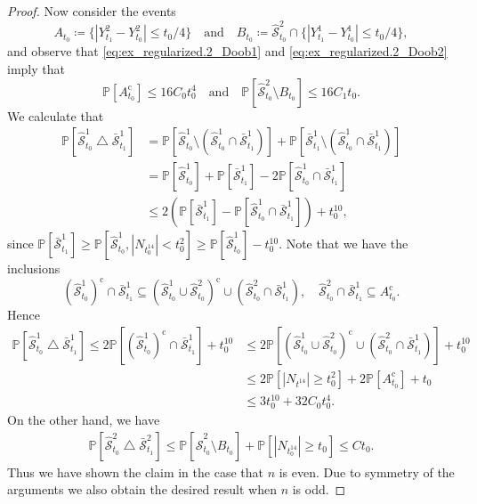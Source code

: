 \documentclass[12pt,oneside]{amsart}
\theoremstyle{definition}
\newcommand{\Scc}{\hat{\mathcal S}}
\newcommand{\Sccc}{\bar{\mathcal S}}
\def\P{{\mathbb P}}
\numberwithin{equation}{section}
\begin{document}
\begin{proof}
   Now consider the events
    \begin{equation}
        A_{t_0} \coloneqq \{ |Y_{t_1}^2 - Y_{t_0}^2| \le t_0 / 4 \} \quad
        \mbox{and}\quad
        B_{t_0} \coloneqq \Scc^2_{t_0} \cap \{ |Y_{t_1}^1 - Y_{t_0}^1| \le t_0 / 4 \},
    \end{equation}
    and observe that \eqref{eq:ex_regularized.2_Doob1} and \eqref{eq:ex_regularized.2_Doob2} imply that
    \begin{equation}
        \P[A_{t_0}^\textrm{c}] \le 16C_0 t_0^4 \quad \mbox{and} \quad
        \P[\Scc^2_{t_0} \setminus B_{t_0}] \le 16 C_1 t_0.
    \end{equation}
   We calculate that
   \begin{align}
        \P[\Scc_{t_0}^1 \bigtriangleup \Sccc_{t_1}^1] & = \P[\Scc_{t_0}^1 \setminus (\Scc_{t_0}^1 \cap \Sccc_{t_1}^1)] + \P[\Sccc_{t_1}^1 \setminus (\Scc_{t_0}^1 \cap \Sccc_{t_1}^1)] \\
        & = \P[\Scc^1_{t_0}] + \P[\Sccc^1_{t_1}] - 2\P[\Scc^1_{t_0} \cap \Sccc^1_{t_1}]\\
        & \le 2(\P[\Sccc_{t_1}^1] - \P[\Scc_{t_0}^1 \cap \Sccc_{t_1}^1]) + t_0^{10},
   \end{align}
   since $\P[\Sccc^1_{t_1}] \geq \P[\Scc^1_{t_0}, |N_{t_0^{14}}| < t_0^2] \geq \P[\Scc^1_{t_0}] - t_0^{10}$.
   Note that we have the inclusions
   \begin{equation}
   		(\Scc_{t_0}^1)^\textrm{c} \cap \Sccc_{t_1}^1 \subseteq (\Scc^1_{t_0} \cup \Scc^2_{t_0})^\textrm{c} \cup (\Scc_{t_0}^2 \cap \Sccc_{t_1}^1), \quad \Scc^2_{t_0} \cap \Sccc^1_{t_1} \subseteq A_{t_0}^\textrm{c}.
   \end{equation}
   Hence
   \begin{align}
        \P[\Scc_{t_0}^1 \bigtriangleup \Sccc_{t_1}^1] \le 2\P[(\Scc^1_{t_0})^\textrm{c} \cap \Sccc^1_{t_1}] + t_0^{10}
        & \le 2 \P[(\Scc_{t_0}^1 \cup \Scc_{t_0}^2)^\textrm{c} \cup (\Scc_{t_0}^2 \cap \Sccc_{t_1}^1)] + t_0^{10}
        \\
        & \le 2 \P[|N_{t^{14}}| \ge t_0^2] + 2 \P[A_{t_0}^\textrm{c}] + t_0\\
        & \le 3 t_0^{10} + 32 C_0 t_0^4.
    \end{align}
    On the other hand, we have
    \begin{align}
        \P[\Scc_{t_0}^2 \bigtriangleup \Sccc_{t_1}^2] \le \P[\Scc^2_{t_0} \setminus B_{t_0}] + \P[|N_{t_0^{14}}| \geq t_0]\le C t_0.
    \end{align}
    Thus we have shown the claim in the case that $n$ is even. Due to symmetry of the arguments we also obtain the desired result when $n$ is odd.	
\end{proof}





\end{document}
